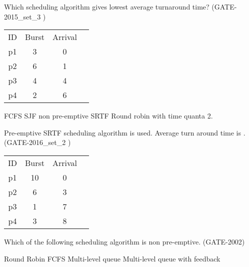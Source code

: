 \begin{questyle}

  \question  Which scheduling algorithm gives lowest average turnaround time? (GATE-2015\_set\_3 )
      \begin{center}
      \begin{tabular}{ c c c c }
          ID & Burst & Arrival\\
          p1 & 3  & 0 \\
          p2 & 6  & 1 \\
          p3 & 4  & 4 \\
          p4 & 2  & 6 \\
      \end{tabular}
    \end{center}

  \begin{choices}
    \choice FCFS
    \choice SJF non pre-emptive
    \choice SRTF
    \choice Round robin with time quanta 2.
  \end{choices}

  \end{questyle}





\begin{questyle}

  \question Pre-emptive SRTF scheduling algorithm is used. Average turn around time is \fillin[time]. (GATE-2016\_set\_2 )
      \begin{center}
      \begin{tabular}{ c c c c }
          ID & Burst & Arrival\\
          p1 & 10  & 0 \\
          p2 & 6  & 3 \\
          p3 & 1  & 7 \\
          p4 & 3  & 8 \\
      \end{tabular}
    \end{center}

  \end{questyle}





\begin{questyle}

  \question  Which of the following scheduling algorithm is non pre-emptive. (GATE-2002)

  \begin{choices}
    \choice Round Robin
    \choice FCFS
    \choice Multi-level queue
    \choice Multi-level queue with feedback
  \end{choices}

  \end{questyle}




